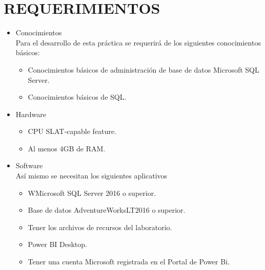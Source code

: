 \documentclass[12pt,letterpaper]{article}
\begin{document}
    \section{REQUERIMIENTOS}
    \begin{itemize}
        \item Conocimientos\\
        Para el desarrollo de esta práctica se requerirá de los siguientes conocimientos básicos:
        \begin{itemize} 
            \item Conocimientos básicos de administración de base de datos Microsoft SQL Server.
            \item Conocimientos básicos de SQL.
        \end{itemize}
        \item Hardware
        \begin{itemize}
            \item CPU SLAT-capable feature.
            \item Al menos 4GB de RAM.
        \end{itemize}
        \item Software\\
        Así mismo se necesitan los siguientes aplicativos
        \begin{itemize}
            \item WMicrosoft SQL Server 2016 o superior.
            \item Base de datos AdventureWorksLT2016 o superior.
            \item Tener los archivos de recursos del laboratorio.
            \item Power BI Desktop.
            \item Tener una cuenta Microsoft registrada en el Portal de Power Bi.
        \end{itemize}
    \end{itemize}
\end{document}
